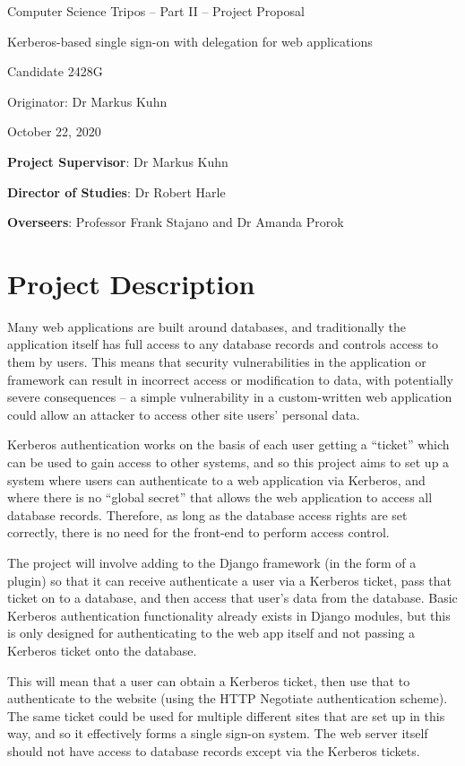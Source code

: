 \documentclass{standalone}
\begin{document}
\begin{center}
{\Large Computer Science Tripos -- Part II -- Project Proposal}

\vspace{5mm}

{\Large Kerberos-based single sign-on with delegation for web applications}

Candidate 2428G

Originator: Dr Markus Kuhn

October 22, 2020
\end{center}

\textbf{Project Supervisor}: Dr Markus Kuhn

\textbf{Director of Studies}: Dr Robert Harle

\textbf{Overseers}: Professor Frank Stajano and Dr Amanda Prorok


\section*{Project Description}
Many web applications are built around databases, and traditionally the application itself has full access to any database records and controls access to them by users. This means that security vulnerabilities in the application or framework can result in incorrect access or modification to data, with potentially severe consequences -- a simple vulnerability in a custom-written web application could allow an attacker to access other site users’ personal data.

Kerberos authentication works on the basis of each user getting a ``ticket'' which can be used to gain access to other systems, and so this project aims to set up a system where users can authenticate to a web application via Kerberos, and where there is no ``global secret'' that allows the web application to access all database records. Therefore, as long as the database access rights are set correctly, there is no need for the front-end to perform access control.

The project will involve adding to the Django framework (in the form of a plugin) so that it can receive authenticate a user via a Kerberos ticket, pass that ticket on to a database, and then access that user’s data from the database. Basic Kerberos authentication functionality already exists in Django modules, but this is only designed for authenticating to the web app itself and not passing a Kerberos ticket onto the database.

This will mean that a user can obtain a Kerberos ticket, then use that to authenticate to the website (using the HTTP Negotiate authentication scheme). The same ticket could be used for multiple different sites that are set up in this way, and so it effectively forms a single sign-on system. The web server itself should not have access to database records except via the Kerberos tickets.
\end{document}
